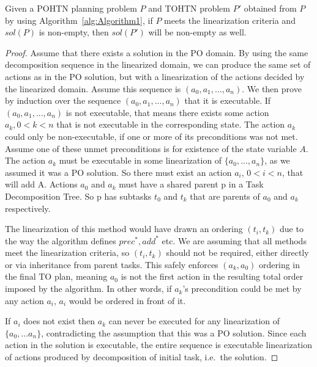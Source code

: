 \begin{theorem}\label{thm:SpecialCase}
	Given a POHTN planning problem $P$ and TOHTN problem $P'$ obtained from $P$ by using Algorithm~\ref{alg:Algorithm1}, if $P$ meets the linearization criteria and $sol(P)$ is non-empty, then $sol(P')$ will be non-empty as well.
\end{theorem}
\begin{proof}
	Assume that there exists a solution in the PO domain. By using the same decomposition sequence in the linearized domain, we can produce the same set of actions as in the PO solution, but with a linearization of the actions decided by the linearized domain. Assume this sequence is $(a_0, a_1, ..., a_n)$. We then prove by induction over the sequence $(a_0, a_1, ..., a_n)$ that it is executable.
	If $(a_0, a_1, ..., a_n)$ is not executable, that means there exists some action $a_k,  0 < k < n$ that is not executable in the corresponding state. The action $a_k$ could only be non-executable, if one or more of its preconditions was not met. Assume one of these unmet preconditions is for existence of the state variable $A$.
	The action $a_k$ must be executable in some linearization of $\{a_0, ..., a_n\}$, as we assumed it was a PO solution. So there must exist an action $a_i$, $0 < i < n$, that will add A. Actions $a_0$ and $a_k$ must have a shared parent p in a Task Decomposition Tree. So p has subtasks $t_0$ and $t_k$ that are parents of $a_0$ and $a_k$ respectively.

	The linearization of this method would have drawn an ordering $(t_i, t_k)$ due to the way the algorithm defines $prec^{*}, add^{*}$ etc. We are assuming that all methods meet the linearization criteria, so $(t_i, t_k)$ should not be required, either directly or via inheritance from parent tasks. This safely enforces $(a_k, a_0)$ ordering in the final TO plan, meaning $a_0$ is not the first action in the resulting total order imposed by the algorithm. In other words, if $a_k$’s precondition could be met by any action $a_i$, $a_i$ would be ordered in front of it.

	If $a_i$ does not exist then $a_k$ can never be executed for any linearization of $\{a_0, ...a_n\}$, contradicting the assumption that this was a PO solution. Since each action in the solution is executable, the entire sequence is executable linearization of actions produced by decomposition of initial task, i.e.\ the solution.
\end{proof}




